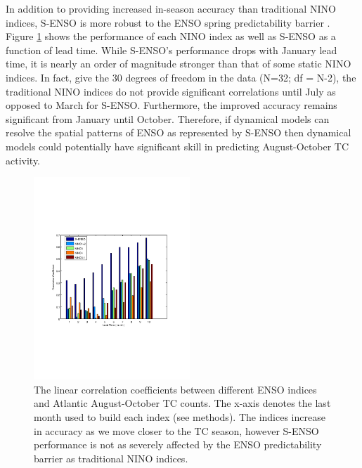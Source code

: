 In addition to providing increased in-season accuracy than traditional NINO indices, S-ENSO is more robust to the ENSO spring predictability barrier \cite{webster1992}. Figure \ref{fig:figures_lead_time_bar} shows the performance of each NINO index as well as S-ENSO as a function of lead time. While S-ENSO's performance drops with January lead time, it is nearly an order of magnitude stronger than that of some static NINO indices. In fact, give the 30 degrees of freedom in the data (N=32; df = N-2), the traditional NINO indices do not provide significant correlations until July as opposed to March for S-ENSO. Furthermore, the improved accuracy remains significant from January until October. Therefore, if dynamical models can resolve the spatial patterns of ENSO as represented by S-ENSO then dynamical models could potentially have significant skill in predicting August-October TC activity.

\begin{figure}[htbp]
	\centering
		\includegraphics[height=3in]{figures/lead_time_bar.pdf}
	\caption{The linear correlation coefficients between different ENSO indices and Atlantic August-October TC counts. The x-axis denotes the last month used to build each index (see methods). The indices increase in accuracy as we move closer to the TC season, however S-ENSO performance is not as severely affected by the ENSO predictability barrier as traditional NINO indices.}
	\label{fig:figures_lead_time_bar}
\end{figure}

\newpage
